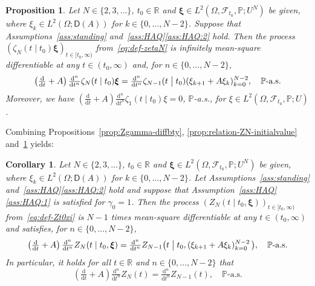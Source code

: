 \documentclass[reqno]{amsart}
\numberwithin{equation}{section}
\newcommand{\bbP}{\mathbb{P}}
\newcommand{\bbR}{\mathbb{R}}
\newcommand{\cF}{\mathcal{F}}
\newtheorem{proposition}[lemma]{Proposition}
\newtheorem{corollary}[lemma]{Corollary}
\theoremstyle{remark}
\theoremstyle{definition}
\begin{document}
\begin{proposition}\label{prop:recurrence-zeta}
	Let $N \in \{2,3,\dots\}$, $t_0 \in \bbR$ and $\bm\xi \in L^2(\Omega, \cF_{t_0},\bbP; U^{N})$
	be given,
	where $\xi_k \in L^2(\Omega; \mathsf D(A))$ for $k \in \{0, \dots,  N-2\}$.
	Suppose that Assumptions~\textup{\ref{ass:standing} and~\ref{ass:HAQ}\ref{ass:HAQ:2}} hold.
	Then the process $(\zeta_{N}(t \mid t_0)\bm{\xi})_{t \in [t_0,\infty)}$ from~\eqref{eq:def-zetaN}
	is infinitely mean-square differentiable at any $t \in (t_0, \infty)$
	and, for $n \in \{0,\dots,N-2\}$,
	\begin{equation}\label{eq:recurrence-zeta}
		\left(\tfrac{\mathrm d}{\mathrm dt} + A\right)\tfrac{\mathrm d^n}{\mathrm dt^n}
		\zeta_{N}(t \mid t_0) \bm \xi
		= 
		\tfrac{\mathrm d^n}{\mathrm dt^n} \zeta_{N-1}(t \bigm\vert t_0)(\xi_{k+1} + A\xi_{k})_{k=0}^{N-2},
		\quad
		\bbP\text{-a.s.}
	\end{equation}
	Moreover, we have $\left(\tfrac{\mathrm d}{\mathrm dt} + A\right) \tfrac{\mathrm d^n}{\mathrm dt^n} \zeta_{1}(t \mid t_0)\xi 
	= 
	0$, $\bbP$-a.s.,
	for $\xi \in L^2(\Omega, \cF_{t_0}, \bbP; U)$.
\end{proposition}
%
Combining Propositions~\ref{prop:Zgamma-diffbty}, \ref{prop:relation-ZN-initialvalue} and~\ref{prop:recurrence-zeta} yields:
%
\begin{corollary}\label{cor:recurrence-}
	Let $N \in \{2,3,\dots\}$, $t_0 \in \bbR$ and $\bm\xi \in L^2(\Omega, \cF_{t_0},\bbP; U^{N})$
	be given,
	where $\xi_k \in L^2(\Omega; \mathsf D(A))$ for $k \in \{0, \dots,  N-2\}$.
	Let Assumptions~\textup{\ref{ass:standing} and~\ref{ass:HAQ}\ref{ass:HAQ:2}} hold
	and suppose that Assumption~\textup{\ref{ass:HAQ}\ref{ass:HAQ:1}} is satisfied for $\gamma_0 = 1$.
	Then the process $(Z_{N}(t \mid t_0, \bm{\xi}))_{t \in [t_0,\infty)}$ from~\eqref{eq:def-Zt0xi}
	is $N-1$ times mean-square differentiable at any $t \in (t_0, \infty)$
	and satisfies, for $n \in \{0, \dots, N-2\}$,
	\begin{equation}\label{eq:recurrence-Z0-SP}
		\left(\tfrac{\mathrm d}{\mathrm dt} + A\right) \tfrac{\mathrm d^n}{\mathrm dt^n} Z_{N}(t \mid t_0, \bm \xi) 
		= 
		\tfrac{\mathrm d^n}{\mathrm dt^n} Z_{N-1}\bigl(t \bigm\vert t_0, (\xi_{k+1} + A\xi_{k})_{k=0}^{N-2}\,\bigr),
		\quad
		\bbP\text{-a.s.}
	\end{equation}
	In particular, it holds for all $t \in \bbR$ and $n \in \{0, \dots, N-2\}$ that
	\begin{equation}
		\left(\tfrac{\mathrm d}{\mathrm dt} + A\right)\tfrac{\mathrm d^n}{\mathrm dt^n} Z_{N}(t) 
		= 
		\tfrac{\mathrm d^n}{\mathrm dt^n} Z_{N-1}(t),
		\quad
		\bbP\text{-a.s.}
	\end{equation}
\end{corollary}
\end{document}
